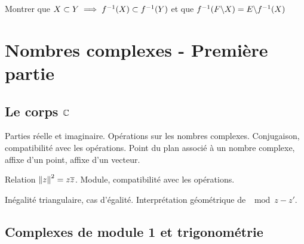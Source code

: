 \documentclass[a4paper,french,bookmarks]{book}
\begin{document}
\begin{enumerate}
        Montrer que $X \subset Y \implies f^{-1}\!\left(X\right) \subset f^{-1}\!\left(Y\right)$ et que $f^{-1}\!\left(F \backslash X\right) = E \backslash f^{-1}\!\left(X\right)$
        
    \end{enumerate}
    
    \cleardoublepage
    \def\khdate{du 4 au 8 octobre 2021}
    \chapter{Nombres complexes - Première partie}
    
    \section*{Le corps $\mathbb{C}$}
    
    \begin{enumerate}
        \ithand Parties réelle et imaginaire. Opérations sur les nombres complexes. Conjugaison, compatibilité avec les opérations. Point du plan associé à un nombre complexe, affixe d'un point, affixe d'un vecteur.
        
        \ithand Relation $\left\Vert z\right\Vert^2 = z\overline{z}$. Module, compatibilité avec les opérations.
        
        \ithand Inégalité triangulaire, cas d'égalité. Interprétation géométrique de $\mod{z - z'}$.
    \end{enumerate}
    
    \section*{Complexes de module 1 et trigonométrie}
    
\end{document}
